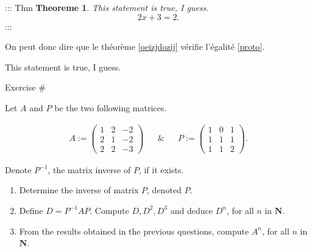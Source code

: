 ::: Thm \textbf{Theoreme 1}. \emph{This statement is true, I guess.
\[\label{proto}
 2x +3 = 2.\]} :::

On peut donc dire que le théorème
\protect\hyperlink{oeizjdozij}{{[}oeizjdozij{]}} vérifie l'égalité
\protect\hyperlink{proto}{{[}proto{]}}.

This statement is true, I guess.

Exercise \#

Let \(A\) and \(P\) be the two following matrices.

\[\begin{aligned}
&A:=  \begin{pmatrix}1 & 2 & -2\\2 & 1 & -2\\2 & 2 & -3\end{pmatrix}&
& \& & 
&P:=  \begin{pmatrix}1 & 0 & 1\\1 & 1 & 1\\1 & 1 & 2\end{pmatrix}.&
\end{aligned}\]

Denote \(P^{-1}\), the matrix inverse of \(P\), if it exists.

\begin{enumerate}
\def\labelenumi{\arabic{enumi}.}
\item
  Determine the inverse of matrix \(P\), denoted \(P\).
\item
  Define \(D=P^{-1}AP\). Compute \(D, D^{2}, D^{3}\) and deduce
  \(D^{n}\), for all \(n\) in \({\mathbf{N}}\).
\item
  From the results obtained in the previous questions, compute
  \(A^{n}\), for all \(n\) in \({\mathbf{N}}\).
\end{enumerate}
